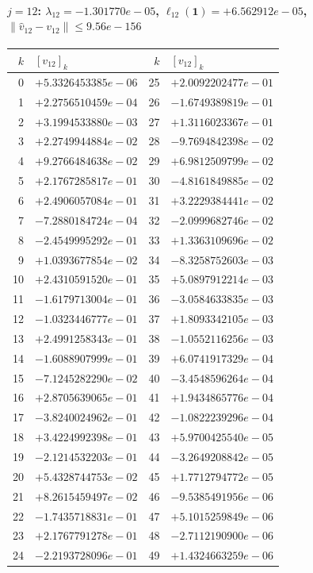 \documentclass[11pt]{article}
\begin{document}
\paragraph{$j = 12$: $\lambda_{12} = -1.301770e-05$, \quad $\ell_{12}(\mathbf{1}) = +6.562912e-05$, \quad $\|\hat v_{12} - v_{12}\| \leq 9.56e-156$}
\begin{center}
{\footnotesize
\begin{tabular}{r@{\;\;}l@{\quad}r@{\;\;}l}
\toprule
$k$ & $[v_{12}]_k$ & $k$ & $[v_{12}]_k$ \\
\midrule
0 & $+5.3326453385e-06$ & 25 & $+2.0092202477e-01$ \\
1 & $+2.2756510459e-04$ & 26 & $-1.6749389819e-01$ \\
2 & $+3.1994533880e-03$ & 27 & $+1.3116023367e-01$ \\
3 & $+2.2749944884e-02$ & 28 & $-9.7694842398e-02$ \\
4 & $+9.2766484638e-02$ & 29 & $+6.9812509799e-02$ \\
5 & $+2.1767285817e-01$ & 30 & $-4.8161849885e-02$ \\
6 & $+2.4906057084e-01$ & 31 & $+3.2229384441e-02$ \\
7 & $-7.2880184724e-04$ & 32 & $-2.0999682746e-02$ \\
8 & $-2.4549995292e-01$ & 33 & $+1.3363109696e-02$ \\
9 & $+1.0393677854e-02$ & 34 & $-8.3258752603e-03$ \\
10 & $+2.4310591520e-01$ & 35 & $+5.0897912214e-03$ \\
11 & $-1.6179713004e-01$ & 36 & $-3.0584633835e-03$ \\
12 & $-1.0323446777e-01$ & 37 & $+1.8093342105e-03$ \\
13 & $+2.4991258343e-01$ & 38 & $-1.0552116256e-03$ \\
14 & $-1.6088907999e-01$ & 39 & $+6.0741917329e-04$ \\
15 & $-7.1245282290e-02$ & 40 & $-3.4548596264e-04$ \\
16 & $+2.8705639065e-01$ & 41 & $+1.9434865776e-04$ \\
17 & $-3.8240024962e-01$ & 42 & $-1.0822239296e-04$ \\
18 & $+3.4224992398e-01$ & 43 & $+5.9700425540e-05$ \\
19 & $-2.1214532203e-01$ & 44 & $-3.2649208842e-05$ \\
20 & $+5.4328744753e-02$ & 45 & $+1.7712794772e-05$ \\
21 & $+8.2615459497e-02$ & 46 & $-9.5385491956e-06$ \\
22 & $-1.7435718831e-01$ & 47 & $+5.1015259849e-06$ \\
23 & $+2.1767791278e-01$ & 48 & $-2.7112190900e-06$ \\
24 & $-2.2193728096e-01$ & 49 & $+1.4324663259e-06$ \\
\bottomrule
\end{tabular}
}
\end{center}
\end{document}
